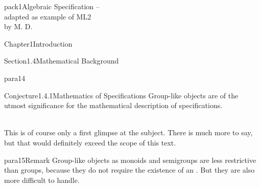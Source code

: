 \documentclass[landscape, slides, light]{mmiss2}
\begin{document}
\begin{Package}{pack1}{Algebraic
Specification -- \\ adapted as example of ML2\\ by M. D.}
\begin{Section}{Chapter1}{Introduction}
\begin{Section}{Section1.4}{Mathematical Background}{}
\begin{Paragraph}{para14}{}{}
\begin{Conjecture}[Specifications]{Conjecture1.4.1}{Mathematics of
Specifications}{}
Group-like objects are of the utmost significance for the mathematical
description of specifications.
\end{Conjecture}
\newline
\hfill \\
This is of course only a first glimpse at the subject. There is much
more to say, but that would definitely exceed the scope of this text.
\end{Paragraph}
\begin{Paragraph}{para15}{Remark}{}
Group-like objects as monoids and semigroups are less restrictive than
groups, because they do not require the existence of an
. But they are also more difficult
 to handle.
\end{Paragraph}
\end{Section}

\end{Section}

\end{Package}
\end{document}
